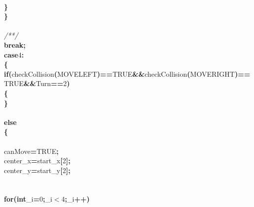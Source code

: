 \documentclass[a4paper, 10pt]{article}
\newcommand\SPC{\hspace*{0.6em}}
\newcommand\HYP{\mbox{\char 45}}
\newcommand{\CppAComment}[1]{\textit{\textcolor[rgb]{0.2,0.6,1}{#1}}}
\newcommand{\CppAIdentifier}[1]{#1}
\newcommand{\CppANumber}[1]{\textcolor[rgb]{0.5,0,0.5}{#1}}
\newcommand{\CppAReservedWord}[1]{\textbf{#1}}
\newcommand{\CppASpace}[1]{\colorbox[rgb]{1,1,1}{#1}}
\newcommand{\CppASymbol}[1]{\textbf{\textcolor[rgb]{1,0,0}{#1}}}
\begin{document}
\begin{ttfamily}
\\
\CppASpace{\SPC \SPC \SPC }\CppASymbol{\}}\\
\CppASpace{\SPC \SPC }\CppASymbol{\}}\\
\\
\CppASpace{\SPC \SPC }\CppAComment{/*\HYP \HYP \HYP \HYP \HYP \HYP \HYP \HYP \HYP \HYP \HYP \HYP \HYP \HYP \HYP \HYP \HYP \HYP \HYP \HYP \HYP \HYP \HYP \HYP \HYP \HYP \HYP \HYP \HYP \HYP \HYP \HYP \HYP \HYP \HYP \HYP \HYP \HYP \HYP \HYP \HYP \HYP \HYP \HYP \HYP \HYP \HYP \HYP \HYP \HYP \HYP \HYP \HYP \HYP \HYP \HYP \HYP \HYP \HYP \HYP \HYP \HYP \HYP \HYP \HYP \HYP \HYP \HYP \HYP \HYP \HYP */}\\
\CppASpace{\SPC \SPC }\CppAReservedWord{break}\CppASymbol{;}\\
\CppASpace{\SPC \SPC }\CppAReservedWord{case}\CppASpace{\SPC }\CppANumber{4}\CppASymbol{:}\\
\CppASpace{\SPC \SPC }\CppASymbol{\{}\\
\CppASpace{\SPC \SPC \SPC }\CppAReservedWord{if}\CppASymbol{(}\CppAIdentifier{checkCollision}\CppASymbol{(}\CppAIdentifier{MOVELEFT}\CppASymbol{)}\CppASymbol{==}\CppAIdentifier{TRUE}\CppASymbol{\&\&}\CppAIdentifier{checkCollision}\CppASymbol{(}\CppAIdentifier{MOVERIGHT}\CppASymbol{)}\CppASymbol{==}\CppAIdentifier{TRUE}\CppASymbol{\&\&}\CppAIdentifier{Turn}\CppASymbol{==}\CppANumber{2}\CppASymbol{)}\\
\CppASpace{\SPC \SPC \SPC }\CppASymbol{\{}\\
\CppASpace{\SPC \SPC \SPC }\CppASymbol{\}}\\
\\
\CppASpace{\SPC \SPC \SPC }\CppAReservedWord{else}\\
\CppASpace{\SPC \SPC \SPC }\CppASymbol{\{}\\
\\
\CppASpace{\SPC \SPC \SPC \SPC }\CppAIdentifier{canMove}\CppASymbol{=}\CppAIdentifier{TRUE}\CppASymbol{;}\\
\CppASpace{\SPC \SPC \SPC \SPC }\CppAIdentifier{center\_x}\CppASymbol{=}\CppAIdentifier{start\_x}\CppASymbol{[}\CppANumber{2}\CppASymbol{]}\CppASymbol{;}\\
\CppASpace{\SPC \SPC \SPC \SPC }\CppAIdentifier{center\_y}\CppASymbol{=}\CppAIdentifier{start\_y}\CppASymbol{[}\CppANumber{2}\CppASymbol{]}\CppASymbol{;}\\
\\
\\
\CppASpace{\SPC \SPC \SPC \SPC }\CppAReservedWord{for}\CppASymbol{(}\CppAReservedWord{int}\CppASpace{\SPC }\CppAIdentifier{\_i}\CppASymbol{=}\CppANumber{0}\CppASymbol{;}\CppAIdentifier{\_i}\CppASymbol{$<$}\CppANumber{4}\CppASymbol{;}\CppAIdentifier{\_i}\CppASymbol{++}\CppASymbol{)}\\

\end{ttfamily}
\end{document}
